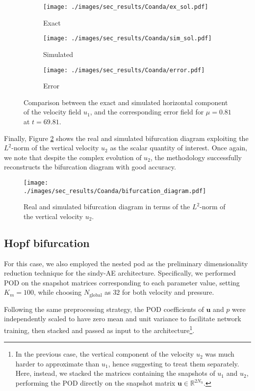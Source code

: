 \documentclass[reqno]{amsart}[standalone]
\theoremstyle{definition}
\theoremstyle{remark}
\newcommand{\R}{\mathbb{R}}
\newcommand{\bs}{\boldsymbol}
\begin{document}
\begin{figure}[htbp]
\begin{subfigure}{0.47\linewidth}
\centering
\texttt{[image: ./images/sec\_results/Coanda/ex\_sol.pdf]}
\caption{Exact}
\end{subfigure}
\begin{subfigure}{0.47\linewidth}
\centering
\texttt{[image: ./images/sec\_results/Coanda/sim\_sol.pdf]}
\caption{Simulated}
\end{subfigure}
\begin{subfigure}{0.47\linewidth}
\centering
\texttt{[image: ./images/sec\_results/Coanda/error.pdf]}
\caption{Error}
\end{subfigure}
\caption{Comparison between the exact and simulated horizontal component of the velocity field $u_1$, and the corresponding error field for $\mu=0.81$ at $t=69.81$.}
\label{fig:coanda_reconstruction}
\end{figure}

Finally, Figure \ref{fig:coanda_diagram} shows the real and simulated bifurcation diagram exploiting the $L^2$-norm of the vertical velocity $u_2$ as the scalar quantity of interest.
Once again, we note that despite the complex evolution of $u_2$,
%
%
the methodology successfully reconstructs the bifurcation diagram with good accuracy.

\begin{figure}[htbp]
    \centering
    \texttt{[image: ./images/sec\_results/Coanda/bifurcation\_diagram.pdf]}
    \caption{Real and simulated bifurcation diagram in terms of the $L^2$-norm of the vertical velocity $u_2$.}
    \label{fig:coanda_diagram}
\end{figure}

\subsection{Hopf bifurcation}
For this case, we also employed the nested \gls{pod} as the preliminary dimensionality reduction technique for the \gls{sindy}-AE architecture.
Specifically, we performed POD on the snapshot matrices corresponding to each parameter value, setting $K_m=100$, while choosing $N_\text{global}$ as $32$ for both velocity and pressure.
%

Following the same preprocessing strategy, the POD coefficients of $\bs{u}$ and $p$ were independently scaled to have zero mean and unit variance to facilitate network training, then stacked and passed as input to the architecture\footnote{In the previous case, the vertical component of the velocity $u_2$ was much harder to approximate than $u_1$, hence suggesting to treat them separately. Here, instead, we stacked the matrices containing the snapshots of $u_1$ and $u_2$, performing the POD directly on the snapshot matrix $\bs{u}\in\R^{2N_h}$.}.
\end{document}
